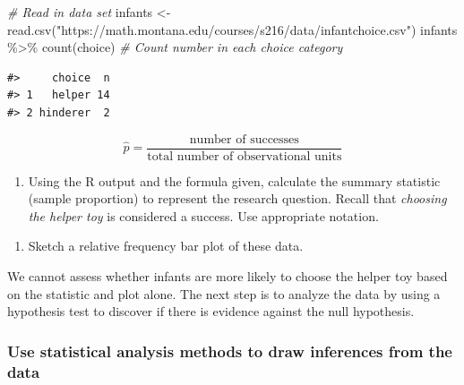 \documentclass[
]{report}
\newenvironment{Shaded}{\begin{snugshade}}{\end{snugshade}}
\newcommand{\CommentTok}[1]{\textcolor[rgb]{0.56,0.35,0.01}{\textit{#1}}}
\newcommand{\FunctionTok}[1]{\textcolor[rgb]{0.00,0.00,0.00}{#1}}
\newcommand{\NormalTok}[1]{#1}
\newcommand{\OtherTok}[1]{\textcolor[rgb]{0.56,0.35,0.01}{#1}}
\newcommand{\SpecialCharTok}[1]{\textcolor[rgb]{0.00,0.00,0.00}{#1}}
\newcommand{\StringTok}[1]{\textcolor[rgb]{0.31,0.60,0.02}{#1}}
\providecommand{\tightlist}{%
  \setlength{\itemsep}{0pt}\setlength{\parskip}{0pt}}
\begin{document}
\begin{Shaded}
\begin{Highlighting}[]
 \CommentTok{\# Read in data set}
\NormalTok{infants }\OtherTok{\textless{}{-}} \FunctionTok{read.csv}\NormalTok{(}\StringTok{"https://math.montana.edu/courses/s216/data/infantchoice.csv"}\NormalTok{)}
\NormalTok{infants }\SpecialCharTok{\%\textgreater{}\%} \FunctionTok{count}\NormalTok{(choice)  }\CommentTok{\# Count number in each choice category}
\end{Highlighting}
\end{Shaded}

\begin{verbatim}
#>     choice  n
#> 1   helper 14
#> 2 hinderer  2
\end{verbatim}

\[\hat{p} = \frac{\mbox{number of successes}}{\mbox{total number of observational units}}\]
\newpage

\begin{enumerate}
\def\labelenumi{\arabic{enumi}.}
\setcounter{enumi}{2}
\tightlist
\item
  Using the R output and the formula given, calculate the summary statistic (sample proportion) to represent the research question. Recall that \emph{choosing the helper toy} is considered a success. Use appropriate notation.
\end{enumerate}

\vspace{0.5in}

\begin{enumerate}
\def\labelenumi{\arabic{enumi}.}
\setcounter{enumi}{3}
\tightlist
\item
  Sketch a relative frequency bar plot of these data.
\end{enumerate}

\vspace{1.5in}

We cannot assess whether infants are more likely to choose the helper toy based on the statistic and plot alone. The next step is to analyze the data by using a hypothesis test to discover if there is evidence against the null hypothesis.

\hypertarget{use-statistical-analysis-methods-to-draw-inferences-from-the-data}{%
\subsubsection*{Use statistical analysis methods to draw inferences from the data}\label{use-statistical-analysis-methods-to-draw-inferences-from-the-data}}
\end{document}
